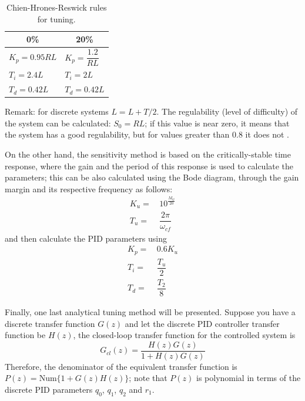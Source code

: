 \begin{table}[H]
\centering
\begin{tabular}{l|l}
\multicolumn{1}{c|}{\textbf{0\%}} & \multicolumn{1}{c}{\textbf{20\%}} \\ \hline
$K_p=0.95RL$                      & $K_p=\dfrac{1.2}{RL}$             \\
$T_i=2.4L$                        & $T_i=2L$                           \\
$T_d=0.42L$                       & $T_d=0.42L$                      
\end{tabular}
\caption{Chien-Hrones-Reswick rules for tuning.}
\label{tab:chien_pid}
\end{table}

Remark: for discrete systems $L=L+T/2$. The regulability (level of difficulty) of the system can be calculated: $S_0=RL$; if this value is near zero, it means that the system has a good regulability, but for values greater than 0.8 it does not \cite{discretePID}.

On the other hand, the sensitivity method \cite{discretePID} is based on the critically-stable time response, where the gain and the period of this response is used to calculate the parameters; this can be also calculated using the Bode diagram, through the gain margin and its respective frequency as follows:
\begin{equation}
    \begin{split}
        K_u =&\, 10^{\frac{M_G}{20}}\\
        T_u =&\, \dfrac{2\pi}{\omega_{cf}}
    \end{split}
\end{equation}
and then calculate the PID parameters using 
\begin{equation}
    \begin{split}
        K_p=&\,0.6K_u\\
        T_i=&\,\dfrac{T_u}{2}\\
        T_d=&\,\dfrac{T_2}{8}
    \end{split}
\end{equation}

Finally, one last analytical tuning method will be presented. Suppose you have a discrete transfer function $G(z)$ and let the discrete PID controller transfer function be $H(z)$, the closed-loop transfer function for the controlled system is
\begin{equation}
    G_{cl}(z)=\dfrac{H(z)G(z)}{1+H(z)G(z)}
\end{equation}
Therefore, the denominator of the equivalent transfer function is $P(z)=\text{Num}\{1+G(z)H(z)\}$; note that $P(z)$ is polynomial in terms of the discrete PID parameters $q_0$, $q_1$, $q_2$ and $r_1$. 

